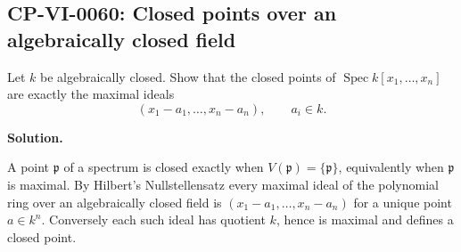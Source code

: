 
\subsection*{CP-VI-0060: Closed points over an algebraically closed field}

Let $k$ be algebraically closed. Show that the closed points of $\operatorname{Spec}k[x_1,\dots,x_n]$ are exactly the maximal ideals
\[
(x_1-a_1,\dots,x_n-a_n),\qquad a_i\in k.
\]

\medskip
\noindent\textbf{Solution.}

A point $\mathfrak p$ of a spectrum is closed exactly when $V(\mathfrak p)=\{\mathfrak p\}$, equivalently when $\mathfrak p$ is maximal. By Hilbert's Nullstellensatz every maximal ideal of the polynomial ring over an algebraically closed field is $(x_1-a_1,\dots,x_n-a_n)$ for a unique point $a\in k^n$. Conversely each such ideal has quotient $k$, hence is maximal and defines a closed point.
